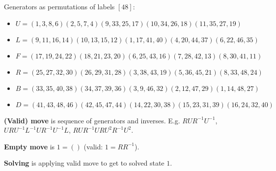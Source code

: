 \begin{slide}
    Generators as permutations of labels $[48]$:

    {\scriptsize
    \begin{itemize}
        \item $U = ( 1, 3, 8, 6)( 2, 5, 7, 4)( 9,33,25,17)(10,34,26,18)(11,35,27,19)$
        \item $L = ( 9,11,16,14)(10,13,15,12)( 1,17,41,40)( 4,20,44,37)( 6,22,46,35)$
        \item $F = (17,19,24,22)(18,21,23,20)( 6,25,43,16)( 7,28,42,13)( 8,30,41,11)$
        \item $R = (25,27,32,30)(26,29,31,28)( 3,38,43,19)( 5,36,45,21)( 8,33,48,24)$
        \item $B = (33,35,40,38)(34,37,39,36)( 3, 9,46,32)( 2,12,47,29)( 1,14,48,27)$
        \item $D = (41,43,48,46)(42,45,47,44)(14,22,30,38)(15,23,31,39)(16,24,32,40)$
    \end{itemize}} \pause

    \textbf{(Valid) move} is sequence of generators and inverses. E.g. $RUR^{-1}U^{-1}$, \pause $URU^{-1}L^{-1}UR^{-1}U^{-1}L$, \pause $RUR^{-1}URU^2R^{-1}U^2$.

    \textbf{Empty move} is $1 = ()$ (valid: $1 = RR^{-1}$). \pause

    \textbf{Solving} is applying valid move to get to solved state $1$.
\end{slide}





